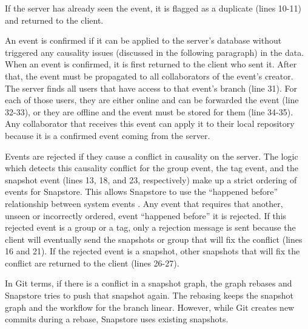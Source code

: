 If the server has already seen the event, it is flagged as a duplicate (lines 10-11) and returned to the client. 

An event is confirmed if it can be applied to the server's database without triggered any causality issues (discussed in the following paragraph) in the data. When an event is confirmed, it is first returned to the client who sent it. After that, the event must be propagated to all collaborators of the event's creator. The server finds all users that have access to that event's branch (line 31). For each of those users, they are either online and can be forwarded the event (line 32-33), or they are offline and the event must be stored for them (line 34-35). Any collaborator that receives this event can apply it to their local repository because it is a confirmed event coming from the server.

Events are rejected if they cause a conflict in causality on the server. The logic which detects this causality conflict for the group event, the tag event, and the snapshot event (lines 13, 18, and 23, respectively) make up a strict ordering of events for Snapstore. This allows Snapstore to use the ``happened before'' relationship between system events \cite{Lamport}. Any event that requires that another, unseen or incorrectly ordered, event ``happened before'' it is rejected. If this rejected event is a group or a tag, only a rejection message is sent because the client will eventually send the snapshots or group that will fix the conflict (lines 16 and 21). If the rejected event is a snapshot, other snapshots that will fix the conflict are returned to the client (lines 26-27). 

In Git terms, if there is a conflict in a snapshot graph, the graph rebases and Snapstore tries to push that snapshot again. The rebasing keeps the snapshot graph and the workflow for the branch linear. However, while Git creates new commits during a rebase, Snapstore uses existing snapshots.


